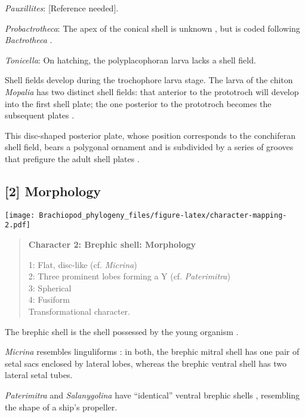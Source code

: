 \documentclass[openany]{book}
\theoremstyle{definition}
\theoremstyle{definition}
\theoremstyle{definition}
\theoremstyle{remark}
\begin{document}
\hypertarget{Pauxillites-coding-1}{}
\emph{Pauxillites}: {[}Reference needed{]}.

\hypertarget{Probactrotheca-coding-1}{}
\emph{Probactrotheca}: The apex of the conical shell is unknown
\citep{Valent2012}, but is coded following \emph{Bactrotheca}
\citep{Dzik1980Ontogenyof}.

\hypertarget{Tonicella-coding-1}{}
\emph{Tonicella}: On hatching, the polyplacophoran larva lacks a shell
field.

Shell fields develop during the trochophore larva stage. The larva of
the chiton \emph{Mopalia} has two distinct shell fields: that anterior
to the prototroch will develop into the first shell plate; the one
posterior to the prototroch becomes the subsequent plates
\citep{Wanninger2002C}.

This disc-shaped posterior plate, whose position corresponds to the
conchiferan shell field, bears a polygonal ornament and is subdivided by
a series of grooves that prefigure the adult shell plates
\citep{Wanninger2002C}.

\subsection*{{[}2{]} Morphology}\label{morphology}

\texttt{[image: Brachiopod\_phylogeny\_files/figure-latex/character-mapping-2.pdf]}

\begin{quote}
\textbf{Character 2: Brephic shell: Morphology}

1: Flat, disc-like (cf. \emph{Micrina})\\
2: Three prominent lobes forming a Y (cf. \emph{Paterimitra})\\
3: Spherical\\
4: Fusiform\\
Transformational character.
\end{quote}

The brephic shell is the shell possessed by the young organism
\citep[see][ and references therein for discussion of
terminology]{Ushatinskaya2016Revisionof}.

\emph{Micrina} resembles linguliforms \citep{Holmer2011Firstrecord}: in
both, the brephic mitral shell has one pair of setal sacs enclosed by
lateral lobes, whereas the brephic ventral shell has two lateral setal
tubes.

\emph{Paterimitra} and \emph{Salanygolina} have ``identical'' ventral
brephic shells \citep{Holmer2011Firstrecord}, resembling the shape of a
ship's propeller.
\end{document}
